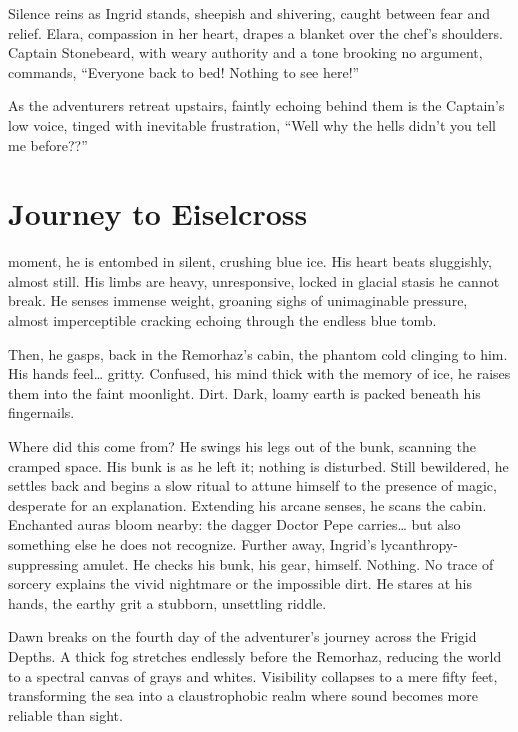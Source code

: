 \documentclass[
  letterpaper,12pt,twoside,twocolumn,openany,
  nodeprecatedcode,bg=full]{dndbook}
\begin{document}
Silence reins as Ingrid stands, sheepish and shivering, caught between
fear and relief. Elara, compassion in her heart, drapes a blanket over
the chef's shoulders. Captain Stonebeard, with weary authority and a
tone brooking no argument, commands, ``Everyone back to bed! Nothing to
see here!''

As the adventurers retreat upstairs, faintly echoing behind them is the
Captain's low voice, tinged with inevitable frustration, ``Well why the
hells didn't you tell me before??''

\chapter{Journey to Eiselcross}\label{journey-to-eiselcross}

 moment, he is entombed in
silent, crushing blue ice. His heart beats sluggishly, almost still. His
limbs are heavy, unresponsive, locked in glacial stasis he cannot break.
He senses immense weight, groaning sighs of unimaginable pressure,
almost imperceptible cracking echoing through the endless blue tomb.

Then, he gasps, back in the Remorhaz's cabin, the phantom cold clinging
to him. His hands feel\ldots{} gritty. Confused, his mind thick with the
memory of ice, he raises them into the faint moonlight. Dirt. Dark,
loamy earth is packed beneath his fingernails.

Where did this come from? He swings his legs out of the bunk, scanning
the cramped space. His bunk is as he left it; nothing is disturbed.
Still bewildered, he settles back and begins a slow ritual to attune
himself to the presence of magic, desperate for an explanation.
Extending his arcane senses, he scans the cabin. Enchanted auras bloom
nearby: the dagger Doctor Pepe carries\ldots{} but also something else
he does not recognize. Further away, Ingrid's lycanthropy-suppressing
amulet. He checks his bunk, his gear, himself. Nothing. No trace of
sorcery explains the vivid nightmare or the impossible dirt. He stares
at his hands, the earthy grit a stubborn, unsettling riddle.

Dawn breaks on the fourth day of the adventurer's journey across the
Frigid Depths. A thick fog stretches endlessly before the Remorhaz,
reducing the world to a spectral canvas of grays and whites. Visibility
collapses to a mere fifty feet, transforming the sea into a
claustrophobic realm where sound becomes more reliable than sight.
\end{document}
